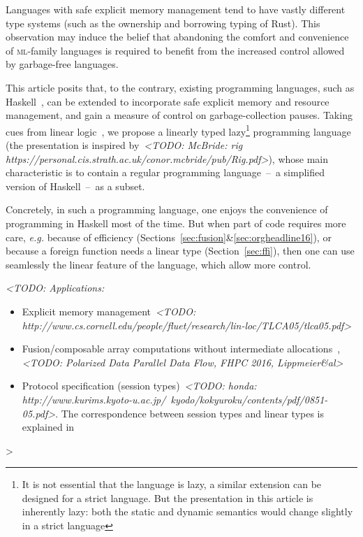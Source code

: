 \documentclass[11pt]{article}
\newcommand{\TODO}[1]{{\footnotesize\it <TODO: #1>}}
\begin{document}
Languages with safe explicit memory management tend to have vastly
different type systems (such as the ownership and borrowing typing of
Rust). This observation may induce the belief that abandoning the
comfort and convenience of \textsc{ml}-family languages is required to benefit
from the increased control allowed by garbage-free languages.

This article posits that, to the contrary, existing programming
languages, such as Haskell~\cite{marlow_haskell_2010}, can be extended
to incorporate safe explicit memory and resource management, and gain
a measure of control on garbage-collection pauses. Taking cues from
linear logic~\cite{girard_linear_1987}, we propose a linearly typed
lazy\footnote{It is not essential that the language is lazy, a similar
  extension can be designed for a strict language. But the
  presentation in this article is inherently lazy: both the static and
  dynamic semantics would change slightly in a strict language}
programming language (the presentation is inspired by~\TODO{McBride:
  rig https://personal.cis.strath.ac.uk/conor.mcbride/pub/Rig.pdf}),
whose main characteristic is to contain a regular programming
language -- a simplified version of Haskell -- as a subset.

Concretely, in such a programming language, one enjoys the convenience
of programming in Haskell most of the time. But when part of code
requires more care, \emph{e.g.} because of efficiency
(Sections~\ref{sec:fusion}\&\ref{sec:orgheadline16}), or because a
foreign function needs a linear type (Section~\ref{sec:ffi}), then one
can use seamlessly the linear feature of the language, which allow
more control.

\TODO{Applications:
\begin{itemize}
\item Explicit memory
  management~\cite{lafont_linear_1988}\cite{hofmann_in-place_}\TODO{http://www.cs.cornell.edu/people/fluet/research/lin-loc/TLCA05/tlca05.pdf}
\item Fusion/composable array computations without intermediate
  allocations~\cite{bernardy_duality_2015},\TODO{Polarized Data
    Parallel Data Flow, FHPC 2016, Lippmeier\&al}
\item Protocol specification (session types)~\TODO{honda: http://www.kurims.kyoto-u.ac.jp/~kyodo/kokyuroku/contents/pdf/0851-05.pdf}. The correspondence between
  session types and linear types is explained in~\cite{wadler_propositions_2012}
\end{itemize}}
\end{document}
